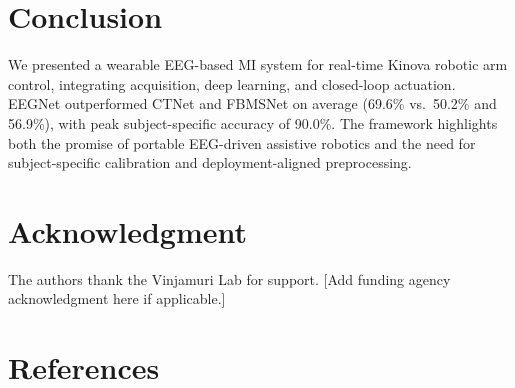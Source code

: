 \documentclass[conference]{IEEEtran}
\begin{document}
\section{Conclusion}
We presented a wearable EEG-based MI system for real-time Kinova robotic arm control, integrating acquisition, deep learning, and closed-loop actuation. EEGNet outperformed CTNet and FBMSNet on average (69.6\% vs.\ 50.2\% and 56.9\%), with peak subject-specific accuracy of 90.0\%. The framework highlights both the promise of portable EEG-driven assistive robotics and the need for subject-specific calibration and deployment-aligned preprocessing.

\section*{Acknowledgment}
The authors thank the Vinjamuri Lab for support. [Add funding agency acknowledgment here if applicable.]

\section*{References}
\end{document}

